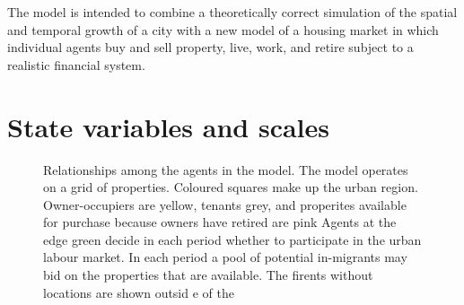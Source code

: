The model  is intended to combine a theoretically correct simulation of the spatial and temporal growth of a city with a new model of a housing market in which individual agents buy and sell property, live, work, and retire subject to a realistic financial system. 



\section{State variables and scales}

\begin{figure}[h!tb]
    \centering
        \resizebox{\textwidth}{!}{}
     \caption{Relationships among the agents in the model. The model operates on a grid of properties. Coloured squares make up the urban region. Owner-occupiers are yellow, tenants grey, and properites available for purchase because owners have retired are pink  Agents at the edge green decide in each period whether to participate in the urban labour market. In each period a pool of potential in-migrants may bid on the properties that are available. The firents without locations are shown outsid e of the }
\label{fig:Kirsten_overview_figure}
\end{figure}

%         


